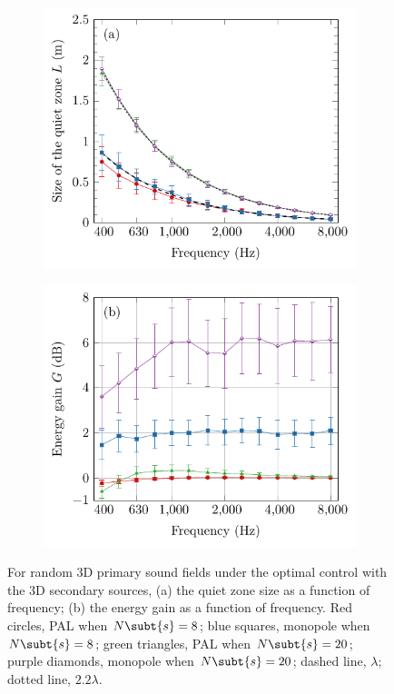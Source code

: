 \begin{figure}[!htb]
    \centering
    \begin{subfigure}{0.49\textwidth}
        \centering
        \includegraphics[width = \textwidth]{fig/200409A_size_v2}
    \end{subfigure}
    \begin{subfigure}{0.49\textwidth}
        \centering
        \includegraphics[width = \textwidth]{fig/200409A_gain_v3}
    \end{subfigure}
    \caption{For random 3D primary sound fields under the optimal control with the 3D secondary sources, (a) the quiet zone size as a function of frequency; (b) the energy gain as a function of frequency. 
    Red circles, PAL when $N\subt{s} = 8$; blue squares, monopole when $N\subt{s} = 8$; green triangles, PAL when $N\subt{s} = 20$; purple diamonds, monopole when $N\subt{s} = 20$; dashed line, $\lambda$; dotted line, $2.2\lambda$.}
    \label{fig:ancpalqz_3dpri_3dsec}
\end{figure}

